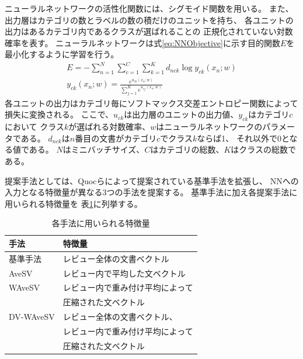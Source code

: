 \documentclass[twocolumn,a4paper]{ltjarticle}
\begin{document}
ニューラルネットワークの活性化関数には、シグモイド関数を用いる。
また、出力層はカテゴリの数とラベルの数の積だけのユニットを持ち、
各ユニットの出力はあるカテゴリ内であるクラスが選ばれることの
正規化されていない対数確率を表す。
ニューラルネットワークは式\ref{eq:NNObjective}に示す目的関数$E$を
最小化するように学習を行う。
\begin{gather}
  E = - \sum^{N}_{n = 1} \sum^{C}_{c = 1} \sum^{K}_{k = 1}
        d_{nck} \log{y_{ck}(x_n; w)}
  \label{eq:NNObjective} \\
  y_{ck}(x_n; w) = \frac{e^{u_{ck}(x_n; w)}}
                        {\sum^{K}_{j = 1} e^{u_{cj}(x_n; w)}}
\end{gather}
各ユニットの出力はカテゴリ毎にソフトマックス交差エントロピー関数によって
損失に変換される。
ここで、$u_{ck}$は出力層のユニットの出力値、$y_{ck}$はカテゴリ$c$において
クラス$k$が選ばれる対数確率、$w$はニューラルネットワークのパラメータである。
$d_{nck}$は$n$番目の文書がカテゴリ$c$でクラス$k$ならば1、
それ以外で0となる値である。
$N$はミニバッチサイズ、$C$はカテゴリの総数、$K$はクラスの総数である。

提案手法としては、Quocら\cite{quoc14}によって提案されている基準手法を拡張し、
NNへの入力となる特徴量が異なる3つの手法を提案する。
基準手法に加え各提案手法に用いられる特徴量を
表\ref{tab:MethodFeatures}に列挙する。

\begin{table}[b]
  \caption{各手法に用いられる特徴量}
  \centering
  \begin{tabularx}{\linewidth}{l | X} \label{tab:MethodFeatures}
    手法 & 特徴量 \\
    \hline
    基準手法 & レビュー全体の文書ベクトル \\
    \hline
    AveSV & レビュー内で平均した文ベクトル \\
    \hline
    WAveSV & レビュー内で重み付け平均によって \\
           & 圧縮された文ベクトル \\
    \hline
    DV-WAveSV & レビュー全体の文書ベクトル、\\
              & レビュー内で重み付け平均によって \\
              & 圧縮された文ベクトル \\
  \end{tabularx}
\end{table}

\end{document}
